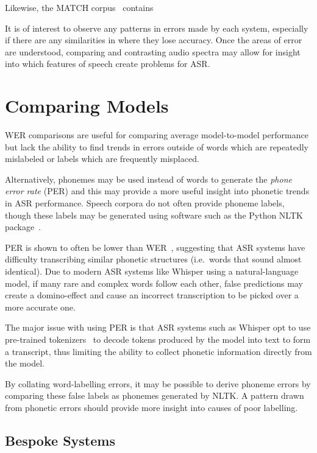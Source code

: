 Likewise, the MATCH corpus~\cite{Georgila2010Sep} contains

It is of interest to observe any patterns in errors made by each system, especially if there are
any similarities in where they lose accuracy.
Once the areas of error are understood, comparing and contrasting audio spectra may allow for
insight into which features of speech create problems for ASR\@.

\section{Comparing Models}\label{sec:comparing-models}

WER comparisons are useful for comparing average model-to-model performance but lack the ability
to find trends in errors outside of words which are repeatedly mislabeled or labels which are
frequently misplaced.

Alternatively, phonemes may be used instead of words to generate the \emph{phone error rate}
(PER) and this may provide a more useful insight into phonetic trends in ASR performance.
Speech corpora do not often provide phoneme labels, though these labels may be generated using
software such as the Python NLTK package~\cite{nltk}.

PER is shown to often be lower than WER~\cite{fang2020}, suggesting that ASR systems have
difficulty transcribing similar phonetic structures (i.e.\ words that sound almost identical).
Due to modern ASR systems like Whisper using a natural-language model, if many rare and complex
words follow each other, false predictions may create a domino-effect and cause an incorrect
transcription to be picked over a more accurate one.

The major issue with using PER is that ASR systems such as Whisper opt to use pre-trained
tokenizers~\cite{huggingfacetransformers} to decode tokens produced by the model into text to
form a transcript, thus limiting the ability to collect phonetic information directly from the
model.

By collating word-labelling errors, it may be possible to derive phoneme errors by comparing
these false labels as phonemes generated by NLTK\@.
A pattern drawn from phonetic errors should provide more insight into causes of poor labelling.

\subsection{Bespoke Systems}\label{subsec:bespoke-systems}

